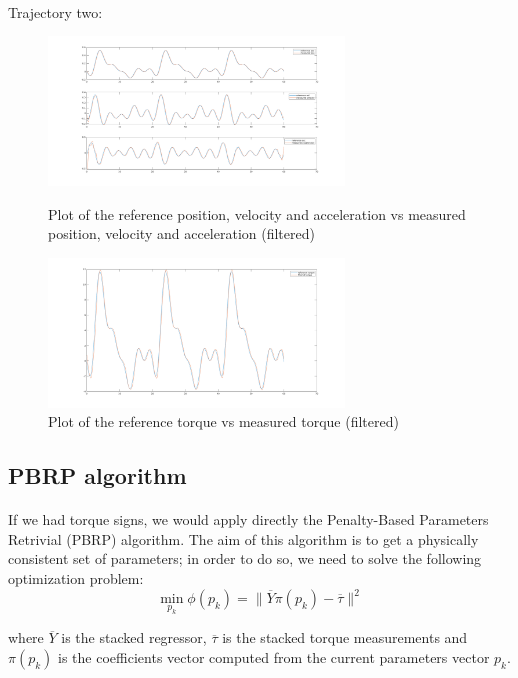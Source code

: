 \documentclass{article}
\begin{document}
\pagebreak
\paragraph{}Trajectory two:

\begin{figure}[!htbp]
\centering
\includegraphics[width=0.7\textwidth]{images/1-dof/new_experiment4_traj.png}
\caption{Plot of the reference position, velocity and acceleration vs measured position, velocity and acceleration (filtered)}
\includegraphics[width=0.7\textwidth]{images/1-dof/new_experiment4.png}
\caption{Plot of the reference torque vs measured torque (filtered)}
\end{figure}
\FloatBarrier

\subsection{PBRP algorithm}
\paragraph{}If we had torque signs, we would apply directly the Penalty-Based Parameters Retrivial (PBRP) algorithm. The aim of this algorithm is to get a physically consistent set of parameters; in order to do so, we need to solve the following optimization problem:
\[\min_{p_k}{\phi(p_k)} = \lVert \overline{Y}\pi(p_k)-\overline{\tau} \rVert^2\]

\noindent where $\overline{Y}$ is the stacked regressor, $\overline{\tau}$ is the stacked  torque measurements and $\pi(p_k)$ is the coefficients vector computed from the current parameters vector $p_k$.
\end{document}

